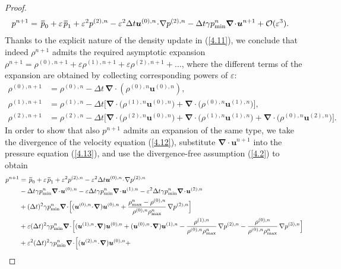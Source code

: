 \documentclass[preprint,12pt]{elsarticle}
\def\muu {\bm{u}}
\def\bnabla{\bm{\nabla}}
\newcommand{\dt}{\Delta t}
\newcommand{\ve}{\varepsilon}
\newcommand\eref[1]{(\ref{#1})}
\newcommand*\xbar[1]{%
	\hbox{%
		\vbox{%
			\hrule height 0.5pt %
			\kern0.4ex%
			\hbox{%
				\kern-0.05em%
				\ensuremath{#1}%
				\kern-0.00em%
			}%
		}%
	}%
}
\begin{document}
\begin{proof}
\begin{align}
		&p^{n+1}=\,\xbar p_0+\ve\,\xbar p_1+\ve^2 p^{(2),n}-\ve^2 \dt \bm u^{(0),n}\!\cdot\!\nabla p^{(2),n} -\dt\gamma p_{\min}^n\bnabla\!\cdot\!\bm u^{n+1}+{\cal O}(\ve^3).\label{4.13}
	\end{align}
	Thanks to the explicit nature of the density update in \eref{4.11}, we conclude that indeed $\rho^{n+1}$ admits the required asymptotic
	expansion $\rho^{n+1}=\rho^{(0),n+1}+\ve\rho^{(1),n+1}+\ve\rho^{(2),n+1}+\dots$, where the different terms of the expansion are obtained by
	collecting corresponding powers of $\ve$:
	\begin{equation}
		\begin{aligned}
			\rho^{(0),n+1}&=\rho^{(0),n}-\dt\,\bnabla\!\cdot\!(\rho^{(0),n}\bm u^{(0),n}),\\
			\rho^{(1),n+1}&=\rho^{(1),n}-\dt \big[\bnabla\!\cdot\!\big(\rho^{(1),n}\bm u^{(0),n}\big)+\bnabla\!\cdot\!\big(\rho^{(0),n}\bm u^{(1),n}\big)\big],\\
			\rho^{(2),n+1}&=\rho^{(2),n}-\dt \big[\bnabla\!\cdot\!\big(\rho^{(2),n}\bm u^{(0),n}\big)+\bnabla\!\cdot\!\big(\rho^{(1),n}\bm u^{(1),n}\big)+\bnabla\!\cdot\!\big(\rho^{(0),n}\bm u^{(2),n}\big)\big].
		\end{aligned}
		\label{3.18}
	\end{equation}
	In order to show that also $p^{n+1}$ admits an expansion of the same type, we take the divergence of the velocity equation \eref{4.12},
	substitute $\bnabla\!\cdot\!\muu^{n+1}$ into the pressure equation \eref{4.13}, and use the divergence-free assumption \eref{4.2} to obtain
	$$
	\begin{aligned}
		p^{n+1}&=\,\xbar p_0+\ve\,\xbar p_1+\ve^2p^{(2),n}-\ve^2\dt\bm u^{(0),n}\!\cdot\!\nabla p^{(2),n}\\
		&-\dt\gamma p_{\min}^n\bnabla\!\cdot\!\bm u^{(0),n}-\ve\dt\gamma p_{\min}^n\bnabla\!\cdot\!\bm u^{(1),n}-
		\ve^2\dt\gamma p_{\min}^n\bnabla\!\cdot\!\bm u^{(2),n}\\
		&+(\dt)^2\gamma p_{\min}^n\bnabla\!\cdot\!\Big[(\bm u^{(0),n}\!\cdot\!\bnabla)\bm u^{(0),n}+
		\frac{\rho_{\max}^n-\rho^{(0),n}}{\rho^{(0),n}\rho_{\max}^n}\,\nabla p^{(2),n}\Big]\\
		&+\ve(\dt)^2\gamma p_{\min}^n\bnabla\!\cdot\!\Big[(\bm u^{(1),n}\!\cdot\!\bnabla)\bm u^{(0),n}+(\bm u^{(0),n}\!\cdot\!\bnabla)\bm u^{(1),n}-
		\frac{\rho^{(1),n}}{\rho^{(0),n}\rho_{\max}^n}\,\nabla p^{(2),n}-\frac{\rho^{(0),n}}{\rho^{(0),n}\rho_{\max}^n}\,\nabla p^{(3),n}\Big]\\
		&+\ve^2 (\dt)^2\gamma p_{\min}^n\bnabla\!\cdot\!\Big[(\bm u^{(2),n}\!\cdot\!\bnabla)\bm u^{(0),n}+

\end{aligned}$$
\end{proof}
\end{document}
